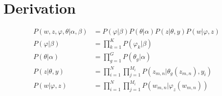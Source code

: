 \documentclass[12pt,a4paper]{amsart}
\begin{document}
\section{Derivation}
\begin{align}
P(w, z, \varphi, \theta | \alpha, \beta) &= P(\varphi | \beta)P(\theta | \alpha)P(z | \theta, y)P(w | \varphi, z)\\
P(\varphi | \beta) &= \prod\limits_{k=1}^K P(\varphi_k|\beta)\\
P(\theta | \alpha) &= \prod\limits_{g=1}^G P(\theta_g|\alpha)\\
P(z | \theta, y) &= \prod\limits_{i=1}^N \prod\limits_{j=1}^{M_i} P(z_{m,n}|\theta_g(z_{m,n}), y_i)\\
P(w | \varphi, z) &= \prod\limits_{i=1}^N \prod\limits_{j=1}^{M_i} P(w_{m,n}|\varphi_z(w_{m,n}))
\end{align}


\end{document}
